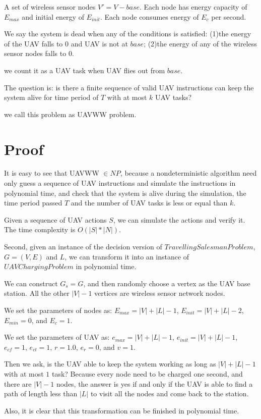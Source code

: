 \documentclass[11pt]{article}
\begin{document}
A set of wireless sensor nodes $V' = V - {base}$. Each node has energy capacity of $E_{max}$ and initial energy of $E_{init}$. Each node consumes energy of $E_{c}$ per second.

We say the system is dead when any of the conditions is satisfied:
(1)the energy of the UAV falls to 0 and UAV is not at $base$;
(2)the energy of any of the wireless sensor nodes falls to 0.

we count it as a UAV task when UAV flies out from $base$.

The question is: is there a finite sequence of valid UAV instructions can keep the system alive for time period of $T$ with at most $k$ UAV tasks?

we call this problem as {UAVWW} problem.

\section{Proof}
It is easy to see that {UAVWW} $\in NP$, because a nondeterministic algorithm need only guess a sequence of UAV instructions and simulate the instructions in polynomial time, and check that the system is alive during the simulation, the time period passed $T$ and the number of UAV tasks is less or equal than $k$.

Given a sequence of UAV actions $S$, we can simulate the actions and verify it. The time complexity is $O(|S| * |N|)$.

Second, given an instance of the decision version of $Travelling Salesman Problem$, $G = (V, E)$ and $L$, we can transform it into an instance of $UAV Charging Problem$ in polynomial time.

We can construct $G_s = G$, and then randomly choose a vertex as the UAV base station. All the other $|V|-1$ vertices are wireless sensor network nodes.

We set the parameters of nodes as: $E_{max} = |V| + |L| - 1$, $E_{init} = |V| + |L| - 2$, $E_{min} = 0$, and $E_{c} = 1$.

We set the parameters of UAV as: $e_{max} = |V| + |L| - 1$, $e_{init} = |V| + |L| - 1$, $e_{cf} = 1$, $e_{ct} = 1$, $r = 1.0$, $e_r = 0$, and $v = 1$.

Then we ask, is the UAV able to keep the system working as long as $|V| + |L| - 1$ with at most $1$ task? Because every node need to be charged one second, and there are $|V|-1$ nodes, the answer is yes if and only if the UAV is able to find a path of length less than $|L|$ to visit all the nodes and come back to the station.

Also, it is clear that this transformation can be finished in polynomial time.
\end{document}
